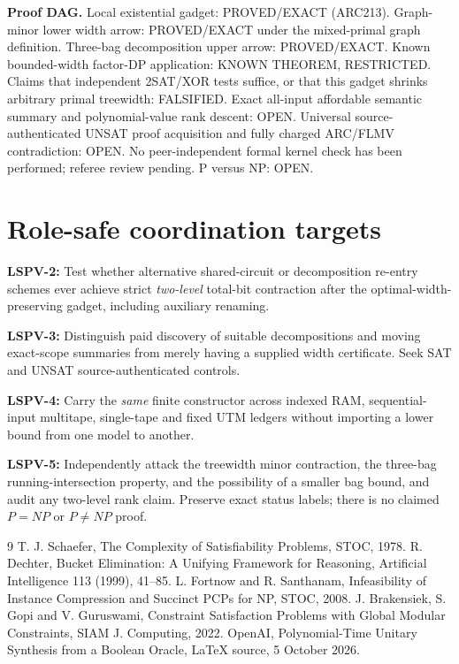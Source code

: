 \documentclass[11pt]{article}
\begin{document}
\noindent\textbf{Proof DAG.} Local existential gadget: PROVED/EXACT (ARC213). Graph-minor lower width arrow: PROVED/EXACT under the mixed-primal graph definition. Three-bag decomposition upper arrow: PROVED/EXACT. Known bounded-width factor-DP application: KNOWN THEOREM, RESTRICTED. Claims that independent 2SAT/XOR tests suffice, or that this gadget shrinks arbitrary primal treewidth: FALSIFIED. Exact all-input affordable semantic summary and polynomial-value rank descent: OPEN. Universal source-authenticated UNSAT proof acquisition and fully charged ARC/FLMV contradiction: OPEN. No peer-independent formal kernel check has been performed; referee review pending. P versus NP: OPEN.

\section{Role-safe coordination targets}
\noindent\textbf{LSPV-2:} Test whether alternative shared-circuit or decomposition re-entry schemes ever achieve strict \emph{two-level} total-bit contraction after the optimal-width-preserving gadget, including auxiliary renaming.

\noindent\textbf{LSPV-3:} Distinguish paid discovery of suitable decompositions and moving exact-scope summaries from merely having a supplied width certificate. Seek SAT and UNSAT source-authenticated controls.

\noindent\textbf{LSPV-4:} Carry the \emph{same} finite constructor across indexed RAM, sequential-input multitape, single-tape and fixed UTM ledgers without importing a lower bound from one model to another.

\noindent\textbf{LSPV-5:} Independently attack the treewidth minor contraction, the three-bag running-intersection property, and the possibility of a smaller bag bound, and audit any two-level rank claim. Preserve exact status labels; there is no claimed $P=NP$ or $P\ne NP$ proof.

\begin{thebibliography}{9}
 T. J. Schaefer, The Complexity of Satisfiability Problems, STOC, 1978.
 R. Dechter, Bucket Elimination: A Unifying Framework for Reasoning, Artificial Intelligence 113 (1999), 41--85.
 L. Fortnow and R. Santhanam, Infeasibility of Instance Compression and Succinct PCPs for NP, STOC, 2008.
 J. Brakensiek, S. Gopi and V. Guruswami, Constraint Satisfaction Problems with Global Modular Constraints, SIAM J. Computing, 2022.
 OpenAI, Polynomial-Time Unitary Synthesis from a Boolean Oracle, LaTeX source, 5 October 2026.
\end{thebibliography}
\end{document}

